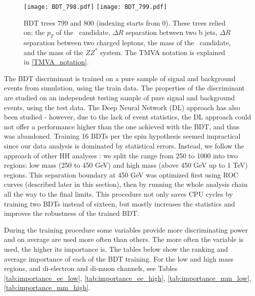 \begin{figure}[H]
\begin{center}
\texttt{[image: BDT\_798.pdf]}
\texttt{[image: BDT\_799.pdf]}\\
\caption[BDT trees 799 and 800.]{BDT trees 799 and 800 (indexing starts from 0). These trees relied on: the $p_T$ of the \Zll~candidate, 
$\Delta R$ separation between two b jets,
$\Delta R$ separation between two charged leptons, 
the mass of the \HBB~candidate, and the mass of the $ZZ^*$ system. The TMVA notation is explained in \ref{TMVA_notation}.} 
\label{fig:bdt_trees_3}
\end{center}
\end{figure}

The BDT discriminant is trained on a pure sample of signal and background events from simulation, using the train data. The properties of the discriminant are studied on an independent testing sample of pure signal and background events, using the test data. The Deep Neural Network (DL) approach has also been studied - however, due to the lack of event statistics, the DL approach could not offer a performance higher than the one achieved with the BDT, and thus was abandoned. Training 16 BDTs per the spin hypothesis seemed impractical since our data analysis is dominated by statistical errors. Instead, we follow the approach of other HH analyses \cite{HH_combination}: we split the range from 250 to 1000 into two regions: low mass (250 to 450 GeV) and high mass (above 450 GeV up to 1 TeV) regions. This separation boundary at 450 GeV was optimized first using ROC curves (described later in this section), then by running the whole analysis chain all the way to the final limits. This procedure not only saves CPU cycles by training two BDTs instead of sixteen, but mostly increases the statistics and improves the robustness of the trained BDT. 

During the training procedure some variables provide more discriminating power and on average are used more often than others. The more often the variable is used, the higher its importance is. The tables below show the ranking and average importance of each of the BDT training. For the low and high mass regions, and di-electron and di-muon channels, see Tables \ref{tab:importance_ee_low}, \ref{tab:importance_ee_high}, \ref{tab:importance_mm_low}, \ref{tab:importance_mm_high}. 

